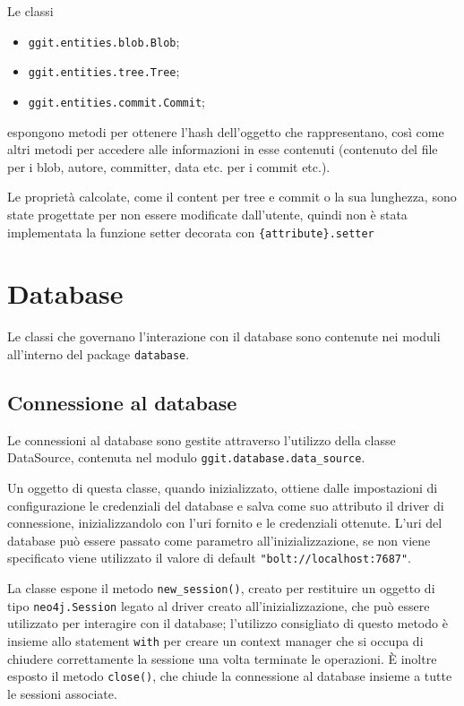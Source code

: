 Le classi 
\begin{itemize}
    \itemsep0em
    \item \texttt{ggit.entities.blob.Blob};
    \item \texttt{ggit.entities.tree.Tree};
    \item \texttt{ggit.entities.commit.Commit};
\end{itemize}
espongono metodi per ottenere l'hash dell'oggetto che rappresentano, così come altri metodi per accedere alle informazioni in esse contenuti (contenuto del file per i blob, autore, committer, data etc. per i commit etc.).

Le proprietà calcolate, come il content per tree e commit o la sua lunghezza, sono state progettate per non essere modificate dall'utente, quindi non è stata implementata la funzione setter decorata con \texttt{\{attribute\}.setter}

\section{Database}

Le classi che governano l'interazione con il database sono contenute nei moduli all'interno del package \texttt{database}.
\vspace{15pt}


\subsection{Connessione al database}

Le connessioni al database sono gestite attraverso l'utilizzo della classe DataSource, contenuta nel modulo \texttt{ggit.database.data\_source}.

Un oggetto di questa classe, quando inizializzato, ottiene dalle impostazioni di configurazione le credenziali del database e salva come suo attributo il driver di connessione, inizializzandolo con l'uri fornito e le credenziali ottenute. L'uri del database può essere passato come parametro all'inizializzazione, se non viene specificato viene utilizzato il valore di default \texttt{"bolt://localhost:7687"}.

La classe espone il metodo \texttt{new\_session()}, creato per restituire un oggetto di tipo \texttt{neo4j.Session} legato al driver creato all'inizializzazione, che può essere utilizzato per interagire con il database; l'utilizzo consigliato di questo metodo è insieme allo statement \texttt{with} per creare un context manager che si occupa di chiudere correttamente la sessione una volta terminate le operazioni.
È inoltre esposto il metodo \texttt{close()}, che chiude la connessione al database insieme a tutte le sessioni associate.


